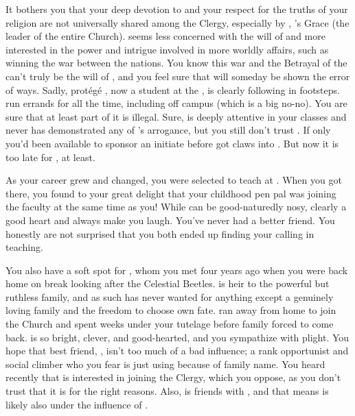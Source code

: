 \documentclass[char]{GL2020}
\begin{document}
It bothers you that your deep devotion to \cTechGod{} and your respect for the truths of your religion are not universally shared among the Clergy, especially by \cAntiChup{\intro}, \cTechGod{}'s Grace \cAntiChup{\themself} (the leader of the entire Church). \cAntiChup{} seems less concerned with the will of \cTechGod{} and more interested in the power and intrigue involved in more worldly affairs, such as winning the war between the nations. You know this war and the Betrayal of the \pShippies{} can't truly be the will of \cTechGod{}, and you feel sure that \cAntiChup{} will someday be shown the error of \cAntiChup{\their} ways. Sadly, \cAntiChup{\their} protégé \cScholarship{\intro}, now a student at the \pSchool{}, is clearly following in \cAntiChup{\their} footsteps. \cScholarship{\They} run\cScholarship{\verbs} errands for \cAntiChup{} all the time, including off campus (which is a big no-no). You are sure that at least part of it is illegal. Sure, \cScholarship{} is deeply attentive in your classes and never has demonstrated any of \cAntiChup{}’s arrogance, but you still don’t trust \cScholarship{\them}. If only you'd been available to sponsor an initiate before \cAntiChup{} got \cAntiChup{\their} claws into \cScholarship{}. But now it is too late for \cScholarship{}, at least.

As your career grew and changed, you were selected to teach at \pSchool{}. When you got there, you found to your great delight that your childhood pen pal \cMusic{} was joining the faculty at the same time as you! While \cMusic{} can be good-naturedly nosy, \cMusic{\they} clearly \cMusic{\have} a good heart and always make\cMusic{\verbs} you laugh. You've never had a better friend. You honestly are not surprised that you both ended up finding your calling in teaching.

You also have a soft spot for \cHeir{\intro}, whom you met four years ago when you were back home on break looking after the Celestial Beetles. \cHeir{} is heir to the powerful but ruthless \cHeir{\formal} family, and as such has never wanted for anything except a genuinely loving family and the freedom to choose \cHeir{\their} own fate. \cHeir{\They} ran away from home to join the Church and spent weeks under your tutelage before \cHeir{\their} family forced \cHeir{\them} to come back. \cHeir{} is so bright, clever, and good-hearted, and you sympathize with \cHeir{\their} plight. You hope that \cHeir{\their} best friend, \cAmbition{\intro}, isn't too much of a bad influence; \cAmbition{\theyare} a rank opportunist and social climber who you fear is just using \cHeir{} because of \cHeir{\their} family name. You heard recently that \cAmbition{} is interested in joining the Clergy, which you oppose, as you don't trust that it is for the right reasons. Also, \cAmbition{} is friends with \cScholarship{}, and that means \cAmbition{} is likely also under the influence of \cAntiChup{}.
\end{document}
